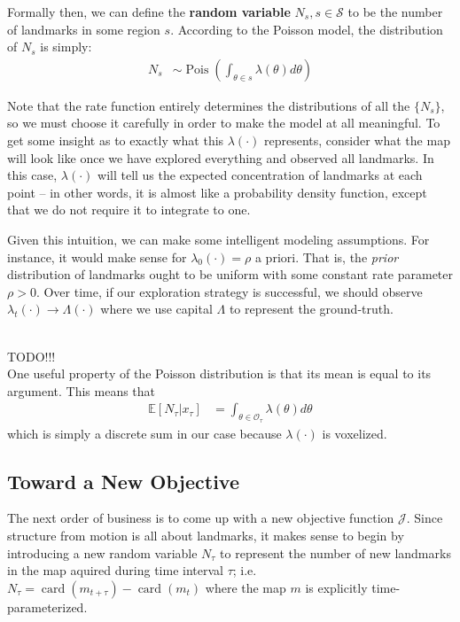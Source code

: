 \documentclass[12pt]{article}
\DeclareMathOperator{\card}{card}
\DeclareMathOperator{\Pois}{Pois}
\begin{document}
Formally then, we can define the \textbf{random variable} $N_s, s \in \mathcal{S}$ to be the number of landmarks in some region $s$. According to the Poisson model, the distribution of $N_s$ is simply:
\begin{align}
  N_s &\sim
  \Pois \left( \int_{\theta \in s} \lambda(\theta) d\theta \right)
\end{align}

Note that the rate function entirely determines the distributions of all the $\{N_s\}$, so we must choose it carefully in order to make the model at all meaningful. To get some insight as to exactly what this $\lambda(\cdot)$ represents, consider what the map will look like once we have explored everything and observed all landmarks. In this case, $\lambda(\cdot)$ will tell us the expected concentration of landmarks at each point -- in other words, it is almost like a probability density function, except that we do not require it to integrate to one.

Given this intuition, we can make some intelligent modeling assumptions. For instance, it would make sense for $\lambda_0(\cdot) = \rho$ a priori. That is, the \textit{prior} distribution of landmarks ought to be uniform with some constant rate parameter $\rho > 0$. Over time, if our exploration strategy is successful, we should observe $\lambda_t(\cdot) \rightarrow \Lambda(\cdot)$ where we use capital $\Lambda$ to represent the ground-truth.

\\TODO!!!\\

One useful property of the Poisson distribution is that its mean is equal to its argument. This means that
\begin{align}
  \mathbb{E}[N_{\tau} | x_{\tau}] &= \int_{\theta \in \mathcal{O_{\tau}}} \lambda(\theta) d\theta
\end{align}
which is simply a discrete sum in our case because $\lambda(\cdot)$ is voxelized.

\subsection{Toward a New Objective}

The next order of business is to come up with a new objective function $\mathcal{J}$. Since structure from motion is all about landmarks, it makes sense to begin by introducing a new random variable $N_{\tau}$ to represent the number of new landmarks in the map aquired during time interval $\tau$; i.e. $N_{\tau} = \card(m_{t + \tau}) - \card(m_t)$ where the map $m$ is explicitly time-parameterized.
\end{document}
